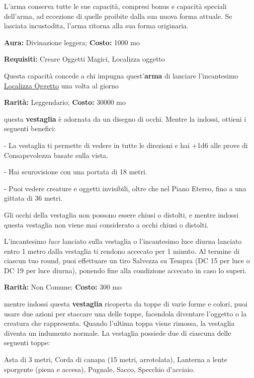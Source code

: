 \begin{multicols}{2}
L'arma conserva tutte le sue capacità, compresi bonus e capacità speciali dell'arma, ad eccezione di quelle proibite dalla sua nuova forma attuale. Se lasciata incustodita, l'arma ritorna alla sua forma originaria.


\textbf{Aura:} Divinazione leggera; \textbf{Costo:} 1000 mo

\textbf{Requisiti:} Creare Oggetti Magici, Localizza oggetto

Questa capacità concede a chi impugna quest'\textbf{arma} di lanciare l'incantesimo \hyperlink{Localizza Oggetto}{Localizza Oggetto} una volta al giorno


\textbf{Rarità:} Leggendario; \textbf{Costo:} 30000 mo

questa \textbf{vestaglia} è adornata da un disegno di occhi. Mentre la indossi, ottieni i seguenti benefici:

- La vestaglia ti permette di vedere in tutte le direzioni e hai +1d6 alle prove di Consapevolezza basate sulla vista.

- Hai scurovisione con una portata di 18 metri.

- Puoi vedere creature e oggetti invisibili, oltre che nel Piano Etereo, fino a una gittata di 36 metri.

Gli occhi della vestaglia non possono essere chiusi o distolti, e mentre indossi questa vestaglia non viene mai considerato a occhi chiusi o distolti.

L'incantesimo \emph{luce} lanciato sulla vestaglia o l'incantesimo luce diurna lanciato entro 1 metro dalla vestaglia ti rendono accecato per 1 minuto. Al termine di ciascun tuo round, puoi effettuare un tiro Salvezza su Tempra (DC 15 per luce o DC 19 per luce diurna), ponendo fine alla condizione accecato in caso lo superi.


\textbf{Rarità:} Non Comune; \textbf{Costo:} 300 mo

mentre indossi questa \textbf{vestaglia} ricoperta da toppe di varie forme e colori, puoi usare due azioni per staccare una delle toppe, facendola diventare l'oggetto o la creatura che rappresenta. Quando l'ultima toppa viene rimossa, la vestaglia diventa un indumento normale. La vestaglia possiede due di ciascuna delle seguenti toppe:

Asta di 3 metri, Corda di canapa (15 metri, arrotolata), Lanterna a lente sporgente (piena e accesa), Pugnale, Sacco, Specchio d'acciaio.


\end{multicols}
